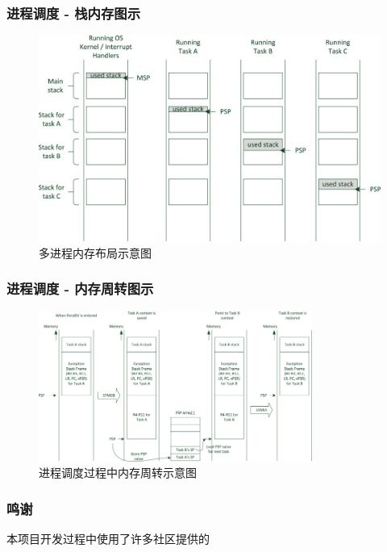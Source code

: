 \documentclass[aspectratio=169]{beamer}
\begin{document}
\begin{frame}

    \frametitle{进程调度 - 栈内存图示}

    \begin{figure}
        \centering
            \captionsetup{font=song}
            \includegraphics[height=0.60\paperheight, keepaspectratio]{3-s2.0-B9780124080829000105-f10-01-9780124080829.jpg}
            \caption{多进程内存布局示意图}
    \end{figure}

\end{frame}

\begin{frame}

    \frametitle{进程调度 - 内存周转图示}

    \begin{figure}
        \centering
            \captionsetup{font=song}
            \includegraphics[width=0.80\textwidth, keepaspectratio]{3-s2.0-B9780124080829000105-f10-10-9780124080829.jpg}
            \caption{进程调度过程中内存周转示意图}
    \end{figure}

\end{frame}

\begin{frame}

    \frametitle{鸣谢}

    本项目开发过程中使用了许多社区提供的
    
\end{frame}
\end{document}
